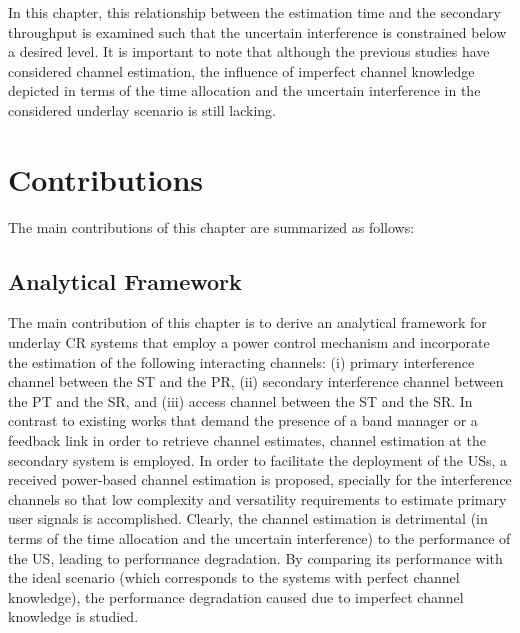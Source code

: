  In this chapter, this relationship between the estimation time and the secondary throughput is examined such that the uncertain interference is constrained below a desired level. It is important to note that although the previous studies have considered channel estimation, the influence of imperfect channel knowledge depicted in terms of the time allocation and the uncertain interference in the considered underlay scenario is still lacking.
 


\section{Contributions}
The main contributions of this chapter are summarized as follows: 
\subsection{Analytical Framework}
The main contribution of this chapter is to derive an analytical framework for underlay CR systems that employ a power control mechanism and incorporate the estimation of the following interacting channels: (i) primary interference channel between the ST and the PR, (ii) secondary interference channel between the PT and the SR, and (iii) access channel between the ST and the SR. In contrast to existing works that demand the presence of a band manager or a feedback link in order to retrieve channel estimates, channel estimation at the secondary system is employed. In order to facilitate the deployment of the USs, a received power-based channel estimation is proposed, specially for the interference channels so that low complexity and versatility requirements to estimate primary user signals is accomplished. Clearly, the channel estimation is detrimental (in terms of the time allocation and the uncertain interference) to the performance of the US, leading to performance degradation. By comparing its performance with the ideal scenario (which corresponds to the systems with perfect channel knowledge), the performance degradation caused due to imperfect channel knowledge is studied. 

